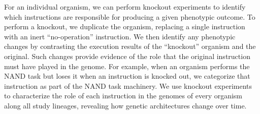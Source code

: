 For an individual organism, we can perform knockout experiments to identify which instructions are responsible for producing a given phenotypic outcome.
To perform a knockout, we duplicate the organism, replacing a single instruction with an inert ``no-operation'' instruction.
We then identify any phenotypic changes by contrasting the execution results of the ``knockout'' organism and the original.
Such changes provide evidence of the role that the original instruction must have played in the genome.
For example, when an organism performs the NAND task but loses it when an instruction is knocked out, we categorize that instruction as part of the NAND task machinery.
We use knockout experiments to characterize the role of each instruction in the genomes of every organism along all study lineages, revealing how genetic architectures change over time.





